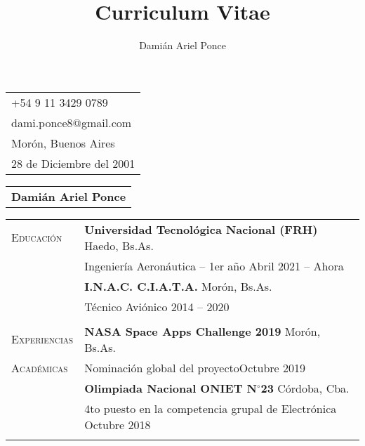 \documentclass[12pt]{article}
\title{Curriculum Vitae}
\author{Damián Ariel Ponce}
\begin{document}
   \noindent
   \begin{tabular}[t]{@{}l} 
     +54 9 11 3429 0789\\
   dami.ponce8@gmail.com\\
   Morón, Buenos Aires\\
   28 de Diciembre del 2001
   \end{tabular}
   \hfill%
   \begin{tabular}[t]{l@{}} 
      \multirow{4}{*}{\textbf{\huge Damián Ariel Ponce}}
   \end{tabular}
   
   \noindent\hrulefill

   \vspace{0.5\baselineskip}\noindent
   \renewcommand{\arraystretch}{1}%
   \begin{tabular}[t]{@{}p{1.15in} @{}p{5.35in}}
   
   {\scshape Educación}
   &
   \textbf{Universidad Tecnológica Nacional (FRH)}  \hfill Haedo, Bs.As.\vspace{0.015in} \\ &
   Ingeniería Aeronáutica -- 1er año \hfill Abril 2021 -- Ahora\vspace{0.015in}
   \vspace{0.5\baselineskip}
   \\
   & \textbf{I.N.A.C. C.I.A.T.A.}  \hfill Morón, Bs.As.\vspace{0.015in} \\ &
   Técnico Aviónico \hfill 2014 -- 2020\vspace{0.015in}
   \\
   \vspace{1\baselineskip}
   \\
      
   {\scshape Experiencias}
   &
   \textbf{NASA Space Apps Challenge 2019}  \hfill Morón, Bs.As.\vspace{0.015in} \\ 
   {\scshape Académicas} %
   & Nominación global del proyecto\hfill Octubre 2019\vspace{0.015in}
   \vspace{0.5\baselineskip}
   \\
   & \textbf{Olimpiada Nacional ONIET N$^{\circ}$23}  \hfill Córdoba, Cba.\vspace{0.015in} \\ &
   4to puesto en la competencia grupal de Electrónica \hfill Octubre 2018\vspace{0.015in}
   \\
   \vspace{1\baselineskip}
   \\


\end{tabular}
\end{document}
